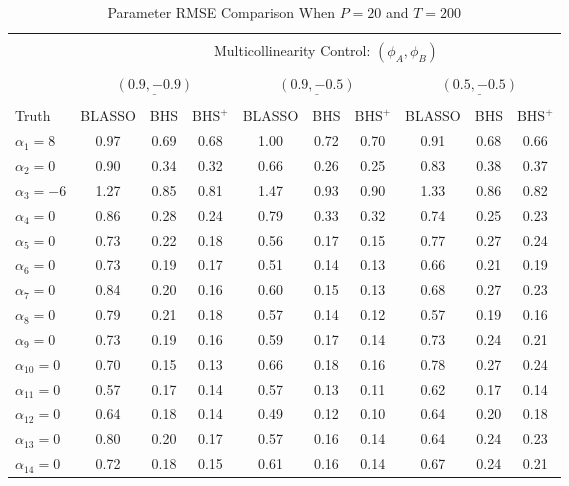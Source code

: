 \begin{table}[htbp]
\scriptsize
\centering
\caption{Parameter RMSE Comparison When $P=20$ and $T=200$}
\begin{tabular}{l|ccc|ccc|ccc}
  \hline
  \multicolumn{1}{c|}{} & \multicolumn{9}{c}{}\\
  & & \multicolumn{7}{c}{Multicollinearity Control: $(\phi_A,\phi_B)$} &  \\
  \multicolumn{1}{c|}{} & \multicolumn{9}{c}{}\\
    & \multicolumn{3}{c}{$\underline{(0.9 ,-0.9)} $} & \multicolumn{3}{c}{$\underline{(0.9 ,-0.5)} $} & \multicolumn{3}{c}{$\underline{(0.5 ,-0.5)} $}   \\
  \multicolumn{1}{c|}{} & \multicolumn{9}{c}{}\\
 Truth & BLASSO & BHS & $\textrm{BHS}^+$ & BLASSO & BHS & $\textrm{BHS}^+$ & BLASSO & BHS & $\textrm{BHS}^+$ \\ 
\hline
  $\alpha_1=8$ & 0.97 & 0.69 & 0.68 & 1.00 & 0.72 & 0.70 & 0.91 & 0.68 & 0.66 \\ 
  $\alpha_2=0$ & 0.90 & 0.34 & 0.32 & 0.66 & 0.26 & 0.25 & 0.83 & 0.38 & 0.37 \\ 
  $\alpha_3=-6$ & 1.27 & 0.85 & 0.81 & 1.47 & 0.93 & 0.90 & 1.33 & 0.86 & 0.82 \\ 
  $\alpha_4=0$ & 0.86 & 0.28 & 0.24 & 0.79 & 0.33 & 0.32 & 0.74 & 0.25 & 0.23 \\ 
  $\alpha_5=0$ & 0.73 & 0.22 & 0.18 & 0.56 & 0.17 & 0.15 & 0.77 & 0.27 & 0.24 \\ 
  $\alpha_6=0$ & 0.73 & 0.19 & 0.17 & 0.51 & 0.14 & 0.13 & 0.66 & 0.21 & 0.19 \\ 
  $\alpha_7=0$ & 0.84 & 0.20 & 0.16 & 0.60 & 0.15 & 0.13 & 0.68 & 0.27 & 0.23 \\ 
  $\alpha_8=0$ & 0.79 & 0.21 & 0.18 & 0.57 & 0.14 & 0.12 & 0.57 & 0.19 & 0.16 \\ 
  $\alpha_9=0$ & 0.73 & 0.19 & 0.16 & 0.59 & 0.17 & 0.14 & 0.73 & 0.24 & 0.21 \\ 
  $\alpha_{10}=0$ & 0.70 & 0.15 & 0.13 & 0.66 & 0.18 & 0.16 & 0.78 & 0.27 & 0.24 \\ 
  $\alpha_{11}=0$ & 0.57 & 0.17 & 0.14 & 0.57 & 0.13 & 0.11 & 0.62 & 0.17 & 0.14 \\ 
  $\alpha_{12}=0$ & 0.64 & 0.18 & 0.14 & 0.49 & 0.12 & 0.10 & 0.64 & 0.20 & 0.18 \\ 
  $\alpha_{13}=0$ & 0.80 & 0.20 & 0.17 & 0.57 & 0.16 & 0.14 & 0.64 & 0.24 & 0.23 \\ 
  $\alpha_{14}=0$ & 0.72 & 0.18 & 0.15 & 0.61 & 0.16 & 0.14 & 0.67 & 0.24 & 0.21 \\ 

\end{tabular}
\end{table}
